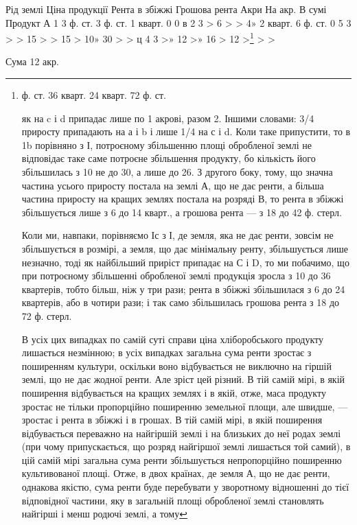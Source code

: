 Рід  землі        Ціна продукції            Рента в збіжжі    Грошова  рента
    Акри    На акр. В сумі    Продукт
А    1    3 ф. ст.    3 ф. ст.    1 кварт.    0    0
в    2    3 >           6 > >   4» 2 кварт.    6 ф. ст.
0    5    3 > >    15 > >    15 >    10» 30 > >
ц    4    3 >» 12 >» 16 >    12 >\footnote{
ф. ст. 36 кварт. 24 кварт. 72 ф. ст.

як на c і d припадає лише по 1 акрові, разом 2. Іншими словами: 3/4 приросту
припадають на а і b і лише 1/4 на с і d. Коли таке припустити, то в
1b порівняно з І, потроєному збільшенню площі обробленої землі не відповідає
таке саме потроєне збільшення продукту, бо кількість його збільшилась з 10
не до 30, а лише до 26. З другого боку, тому, що значна частина усього приросту
постала на землі А, що не дає ренти, а більша частина приросту на
кращих землях постала на розряді В, то рента в збіжжі збільшується лише
з 6 до 14 кварт., а грошова рента — з 18 до 42 ф. стерл.

Коли ми, навпаки, порівняємо Іс з І, де земля, яка не дає ренти, зовсім
не збільшується в розмірі, а земля, що дає мінімальну ренту, збільшується
лише незначно, тоді як найбільший приріст припадає на С і D, то ми побачимо,
що при потроєному збільшенні обробленої землі продукція зросла з 10 до
36 квартерів, тобто більш, ніж у три рази; рента в збіжжі збільшилася з 6 до
24 квартерів, або в чотири рази; і так само збільшилась грошова рента
з 18 до 72 ф. стерл.

В усіх цих випадках по самій суті справи ціна хліборобського продукту
лишається незмінною; в усіх випадках загальна сума ренти зростає з поширенням
культури, оскільки воно відбувається не виключно на гіршій землі, що
не дає жодної ренти. Але зріст цей різний. В тій самій мірі, в якій поширення
відбувається на кращих землях і в якій, отже, маса продукту зростає не тільки
пропорційно поширенню земельної площи, але швидше, — зростає і рента в
збіжжі і в грошах. В тій самій мірі, в якій поширення відбувається переважно
на найгіршій землі і на близьких до неї родах землі (при чому припускається,
що розряд найгіршої землі лишається той самий), в цій самій мірі загальна
сума ренти збільшується непропорційно поширенню культивованої площі. Отже,
в двох країнах, де земля А, що не дає ренти, однакова якістю, сума ренти
буде перебувати у зворотному відношенні до тієї відповідної частини, яку в загальній
площі обробленої землі становлять найгірші і менш родючі землі, а тому
} > >

Сума    12 акр.